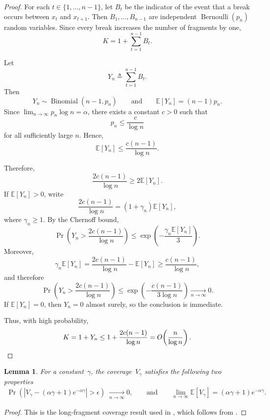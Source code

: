 \documentclass[journal,letterpaper,onecolumn,11pt]{IEEEtran}
\newtheorem{lemma}{Lemma}
\begin{document}
\begin{proof}
For each \(t\in\{1,\dots,n-1\}\), let \(B_t\) be the indicator of the
event that a break occurs between \(x_t\) and \(x_{t+1}\). Then
\(B_1,\dots,B_{n-1}\) are independent
\(\operatorname{Bernoulli}(p_n)\) random variables. Since every break
increases the number of fragments by one,
\[
K=1+\sum_{t=1}^{n-1}B_t.
\]

Let
\[
Y_n\triangleq\sum_{t=1}^{n-1}B_t.
\]
Then
\[
Y_n\sim\operatorname{Binomial}(n-1,p_n)
\qquad\text{and}\qquad
\mathbb E[Y_n]=(n-1)p_n.
\]
Since \(\lim_{n\to\infty}p_n\log n=\alpha\), there exists a constant
\(c>0\) such that
\[
p_n\leq\frac{c}{\log n}
\]
for all sufficiently large \(n\). Hence,
\[
\mathbb E[Y_n]\leq\frac{c(n-1)}{\log n}.
\]

Therefore,
\[
\frac{2c(n-1)}{\log n}\geq2\mathbb E[Y_n].
\]
If \(\mathbb E[Y_n]>0\), write
\[
\frac{2c(n-1)}{\log n}
=
(1+\gamma_n)\mathbb E[Y_n],
\]
where \(\gamma_n\geq1\). By the Chernoff bound,
\[
\Pr\left(
Y_n>\frac{2c(n-1)}{\log n}
\right)
\leq
\exp\left(
-\frac{\gamma_n\mathbb E[Y_n]}{3}
\right).
\]
Moreover,
\[
\gamma_n\mathbb E[Y_n]
=
\frac{2c(n-1)}{\log n}-\mathbb E[Y_n]
\geq
\frac{c(n-1)}{\log n},
\]
and therefore
\[
\Pr\left(
Y_n>\frac{2c(n-1)}{\log n}
\right)
\leq
\exp\left(
-\frac{c(n-1)}{3\log n}
\right)
\xrightarrow[n\to\infty]{}0.
\]
If \(\mathbb E[Y_n]=0\), then \(Y_n=0\) almost surely, so the conclusion
is immediate.

Thus, with high probability,
\[
K
=
1+Y_n
\leq
1+\frac{2c(n-1)}{\log n}
=
O\!\left(\frac{n}{\log n}\right).
\qedhere
\]
\end{proof}

\begin{lemma}\label{lemma:long-fragment-coverage}
For a constant~$\gamma$, the coverage~$V_\gamma$ satisfies the following two properties
    \begin{align}\label{Equation: limit of coverage}
        \Pr\!\left( \left| V_{\gamma} - (\alpha\gamma + 1)e^{-\alpha\gamma} \right| > \epsilon \right)
\;\xrightarrow[n\to\infty]{} 0,\qquad \text{and} \qquad \lim_{n \to \infty} \mathbb{E}[V_\gamma]
    = (\alpha \gamma + 1)e^{-\alpha \gamma}.
\end{align}
\end{lemma}

\begin{proof}
This is the long-fragment coverage result used in
\cite[Lemma~15]{liu2026improved}, which follows from
\cite[Lemma~6]{shomorony2021torn}.
\end{proof}
\end{document}
